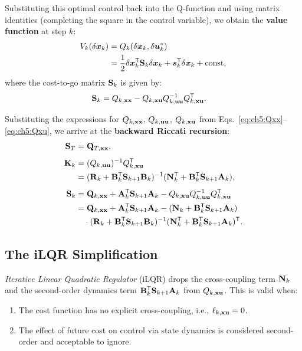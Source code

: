 Substituting this optimal control back into the Q-function and using matrix identities (completing the square
in the control variable), we obtain the \textbf{value function} at step $k$:
\begin{align}
V_k(\delta\bm{x}_k) &= Q_k(\delta\bm{x}_k,\delta\bm{u}_k^*) \notag \\
&= \frac{1}{2}\delta\bm{x}_k^{\mathsf{T}}\mathbf{S}_k\delta\bm{x}_k + \bm{s}_k^{\mathsf{T}}\delta\bm{x}_k + \text{const},
\label{eq:ch5:value-function}
\end{align}
where the cost-to-go matrix $\mathbf{S}_k$ is given by:
\begin{align}
\mathbf{S}_k &= Q_{k,\mathbf{x}\mathbf{x}} - Q_{k,\mathbf{x}\mathbf{u}}Q_{k,\mathbf{u}\mathbf{u}}^{-1}Q_{k,\mathbf{x}\mathbf{u}}^{\mathsf{T}}. \label{eq:ch5:S-def}
\end{align}

Substituting the expressions for $Q_{k,\mathbf{x}\mathbf{x}}$, $Q_{k,\mathbf{u}\mathbf{u}}$, $Q_{k,\mathbf{x}\mathbf{u}}$ from Eqs.~\eqref{eq:ch5:Qxx}--\eqref{eq:ch5:Qxu},
we arrive at the \textbf{backward Riccati recursion}:
\begin{align}
\mathbf{S}_T &= \mathbf{Q}_{T,\mathbf{x}\mathbf{x}}, \label{eq:ch5:riccati-terminal}\\[4pt]
\mathbf{K}_k &= (Q_{k,\mathbf{u}\mathbf{u}})^{-1}Q_{k,\mathbf{x}\mathbf{u}}^{\mathsf{T}} \notag \\
&= (\mathbf{R}_k + \mathbf{B}_k^{\mathsf{T}}\mathbf{S}_{k+1}\mathbf{B}_k)^{-1}(\mathbf{N}_k^{\mathsf{T}} + \mathbf{B}_k^{\mathsf{T}}\mathbf{S}_{k+1}\mathbf{A}_k), \label{eq:ch5:gain-full}\\[4pt]
\mathbf{S}_k &= \mathbf{Q}_{k,\mathbf{x}\mathbf{x}} + \mathbf{A}_k^{\mathsf{T}}\mathbf{S}_{k+1}\mathbf{A}_k - Q_{k,\mathbf{x}\mathbf{u}}Q_{k,\mathbf{u}\mathbf{u}}^{-1}Q_{k,\mathbf{x}\mathbf{u}}^{\mathsf{T}} \notag \\
&= \mathbf{Q}_{k,\mathbf{x}\mathbf{x}} + \mathbf{A}_k^{\mathsf{T}}\mathbf{S}_{k+1}\mathbf{A}_k - (\mathbf{N}_k + \mathbf{B}_k^{\mathsf{T}}\mathbf{S}_{k+1}\mathbf{A}_k)
\notag \\
&\quad \cdot (\mathbf{R}_k + \mathbf{B}_k^{\mathsf{T}}\mathbf{S}_{k+1}\mathbf{B}_k)^{-1}(\mathbf{N}_k^{\mathsf{T}} + \mathbf{B}_k^{\mathsf{T}}\mathbf{S}_{k+1}\mathbf{A}_k)^{\mathsf{T}}. \label{eq:ch5:riccati-full}
\end{align}

\subsection{The iLQR Simplification}

\emph{Iterative Linear Quadratic Regulator} (iLQR) drops the cross-coupling term $\mathbf{N}_k$ and the second-order
dynamics term $\mathbf{B}_k^{\mathsf{T}}\mathbf{S}_{k+1}\mathbf{A}_k$ from $Q_{k,\mathbf{x}\mathbf{u}}$. This is valid when:
\begin{enumerate}
\item The cost function has no explicit cross-coupling, i.e., $\ell_{k,\mathbf{x}\mathbf{u}} = 0$.
\item The effect of future cost on control via state dynamics is considered second-order and acceptable to ignore.
\end{enumerate}

